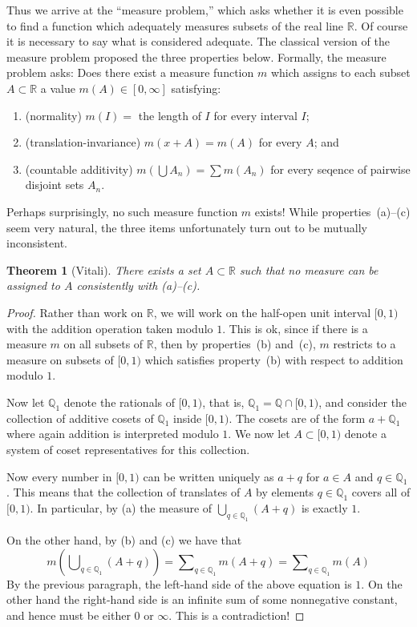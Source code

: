 \documentclass[11pt,oneside]{amsbook}
\newcommand{\QQ}{{\mathbb Q}}
\newcommand{\RR}{{\mathbb R}}
\theoremstyle{definition}
\theoremstyle{plain}
\newtheorem{thm}{Theorem}[section]
\theoremstyle{definition}
\theoremstyle{remark}
\numberwithin{equation}{section}
\numberwithin{figure}{section}
\begin{document}
Thus we arrive at the ``measure problem,'' which asks whether it is even possible to find a function which adequately measures subsets of the real line $\RR$. Of course it is necessary to say what is considered adequate. The classical version of the measure problem proposed the three properties below. Formally, the measure problem asks: Does there exist a measure function $m$ which assigns to each subset $A\subset\RR$ a value $m(A)\in[0,\infty]$ satisfying:
\begin{enumerate}
\item (normality) $m(I)=$ the length of $I$ for every interval $I$;
\item (translation-invariance) $m(x+A)=m(A)$ for every $A$; and
\item (countable additivity) $m(\bigcup A_n)=\sum m(A_n)$ for every seqence of pairwise disjoint sets $A_n$.
\end{enumerate}

Perhaps surprisingly, no such measure function $m$ exists! While properties~(a)--(c) seem very natural, the three items unfortunately turn out to be mutually inconsistent.

\begin{thm}[Vitali]
  There exists a set $A\subset\RR$ such that no measure can be assigned to $A$ consistently with (a)--(c).
\end{thm}

\begin{proof}
  Rather than work on $\RR$, we will work on the half-open unit interval $[0,1)$ with the addition operation taken modulo $1$. This is ok, since if there is a measure $m$ on all subsets of $\RR$, then by properties~(b) and~(c), $m$ restricts to a measure on subsets of $[0,1)$ which satisfies property~(b) with respect to addition modulo $1$.

  Now let $\QQ_1$ denote the rationals of $[0,1)$, that is, $\QQ_1=\QQ\cap[0,1)$, and consider the collection of additive cosets of $\QQ_1$ inside $[0,1)$. The cosets are of the form $a+\QQ_1$ where again addition is interpreted modulo $1$. We now let $A\subset[0,1)$ denote a system of coset representatives for this collection.

  Now every number in $[0,1)$ can be written uniquely as $a+q$ for $a\in A$ and $q\in\QQ_1$. This means that the collection of translates of $A$ by elements $q\in\QQ_1$ covers all of $[0,1)$. In particular, by (a) the measure of $\bigcup_{q\in\QQ_1}(A+q)$ is exactly $1$.

  On the other hand, by (b) and (c) we have that
  \[m\left(\bigcup\nolimits_{q\in\QQ_1}(A+q)\right)
  =\sum\nolimits_{q\in\QQ_1}m(A+q)=\sum\nolimits_{q\in\QQ_1}m(A)
  \]
  By the previous paragraph, the left-hand side of the above equation is $1$. On the other hand the right-hand side is an infinite sum of some nonnegative constant, and hence must be either $0$ or $\infty$. This is a contradiction!
\end{proof}
\end{document}
